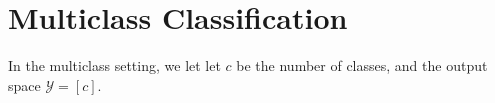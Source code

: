 \documentclass[10pt]{exam}
\theoremstyle{definition}
\newtheorem{fact}{Fact}
\newtheorem{theorem}{Theorem}
\newcommand{\R}{\mathbb R}
\newcommand{\trans}[1]{{#1}^{T}}
\newcommand{\w}{\mathbf w}
\newcommand{\x}{\mathbf x}
\newcommand{\ltwo}[1]{{\lVert {#1} \rVert}_2}
\newcommand{\dvc}{{d_{\text{VC}}}}
\newcommand{\HH}[1]{\mathcal H_{\text{#1}}}
\newcommand{\ignore}[1]{}
\begin{document}
\ignore{
\section*{SVM}

\begin{theorem}[Theorem 8.5, textbook]
    Suppose the input space is the ball of radius $R$ in $\R^d$.
    That is, $\ltwo{\x} \le R$.
    Then,
    \begin{equation}
        \dvc \le \lceil R^2/\rho^2\rceil + 1.
    \end{equation}
\end{theorem}
}

\newpage
\section{Multiclass Classification}


In the multiclass setting, we let
let $c$ be the number of classes,
and the output space $\mathcal Y = [c]$.

\end{document}
